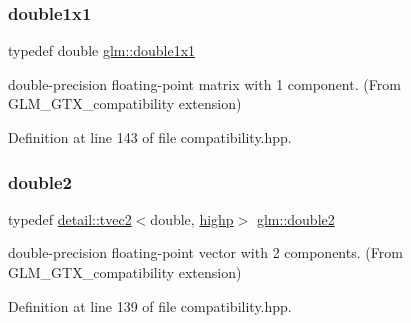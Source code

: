 \mbox{\label{group__gtx__compatibility_ga1c87d3042377335eb050a20ab0ec148a}} 
\subsubsection{\texorpdfstring{double1x1}{double1x1}}
{\footnotesize\ttfamily typedef double \hyperlink{group__gtx__compatibility_ga1c87d3042377335eb050a20ab0ec148a}{glm\+::double1x1}}



double-\/precision floating-\/point matrix with 1 component. (From G\+L\+M\+\_\+\+G\+T\+X\+\_\+compatibility extension) 



Definition at line 143 of file compatibility.\+hpp.

\mbox{\label{group__gtx__compatibility_ga227d30a4fa630c9e3fb6c7ea87250c62}} 
\subsubsection{\texorpdfstring{double2}{double2}}
{\footnotesize\ttfamily typedef \hyperlink{structglm_1_1detail_1_1tvec2}{detail\+::tvec2}$<$double, \hyperlink{namespaceglm_a0f04f086094c747d227af4425893f545ac6f7eab42eacbb10d59a58e95e362074}{highp}$>$ \hyperlink{group__gtx__compatibility_ga227d30a4fa630c9e3fb6c7ea87250c62}{glm\+::double2}}



double-\/precision floating-\/point vector with 2 components. (From G\+L\+M\+\_\+\+G\+T\+X\+\_\+compatibility extension) 



Definition at line 139 of file compatibility.\+hpp.

\mbox{\label{group__gtx__compatibility_ga75cfac00b48c51f4b677151f789b8547}} 
